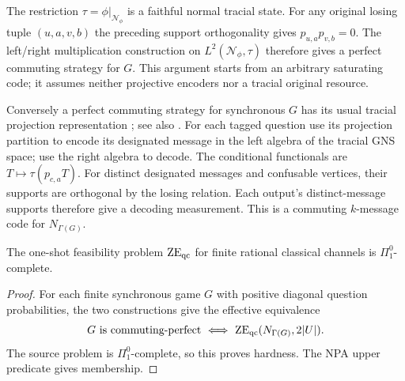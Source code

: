 The restriction $\tau=\phi|_{\mathcal N_\phi}$ is a faithful normal tracial state. For any original losing tuple $(u,a,v,b)$ the preceding support orthogonality gives $p_{u,a}p_{v,b}=0$. The left/right multiplication construction on $L^2(\mathcal N_\phi,\tau)$ therefore gives a perfect commuting strategy for $G$. This argument starts from an arbitrary saturating code; it assumes neither projective encoders nor a tracial original resource.

Conversely a perfect commuting strategy for synchronous $G$ has its usual tracial projection representation \cite[Theorem~5.5]{PSS}; see also \cite{KPS,MNY}. For each tagged question use its projection partition to encode its designated message in the left algebra of the tracial GNS space; use the right algebra to decode. The conditional functionals are $T\mapsto\tau(p_{c,a}T)$. For distinct designated messages and confusable vertices, their supports are orthogonal by the losing relation. Each output's distinct-message supports therefore give a decoding measurement. This is a commuting $k$-message code for $N_{\Gamma(G)}$.

\begin{theorem}\label{thm:qc}
The one-shot feasibility problem $\mathrm{ZE}_{\mathrm{qc}}$ for finite rational classical channels is $\Pi^0_1$-complete.
\end{theorem}
\begin{proof}
For each finite synchronous game $G$ with positive diagonal question probabilities, the two constructions give the effective equivalence
\[
 G\text{ is commuting-perfect}
 \ \Longleftrightarrow\ \mathrm{ZE}_{\mathrm{qc}}(N_{\Gamma(G)},2|U|).
\]
The source problem is $\Pi^0_1$-complete, so this proves hardness. The NPA upper predicate gives membership.
\end{proof}

